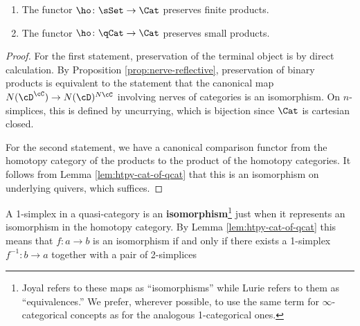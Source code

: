 \begin{lemma}\label{lem:ho-preserves-products}
  $\quad$
  \begin{enumerate}
  \item The functor $\ho \colon \sSet \to \Cat$ preserves finite products.
  \item The functor $\ho \colon \qCat \to \Cat$ preserves small products.
  \end{enumerate}
\end{lemma}
\begin{proof}
  For the first statement, preservation of the terminal object is by direct calculation. By Proposition \ref{prop:nerve-reflective}, preservation of binary products is equivalent to the statement that the canonical map $N(\cD^\cC) \to N(\cD)^{N\cC}$ involving nerves of categories is an isomorphism. On $n$-simplices, this is defined by uncurrying, which is bijection since $\Cat$ is cartesian closed.

  For the second statement, we have a canonical comparison functor from the homotopy category of the products to the product of the homotopy categories. It follows from Lemma \ref{lem:htpy-cat-of-qcat} that this is an isomorphism on underlying quivers, which suffices.
\end{proof}



   \begin{definition}\label{defn:isomorphism}
     A 1-simplex in a quasi-category is an \textbf{isomorphism}\footnote{Joyal refers to these maps as ``isomorphisms'' while Lurie refers to them as ``equivalences.'' We prefer, wherever possible, to use the same term for $\infty$-categorical concepts as for the analogous 1-categorical ones.} just when it represents an isomorphism in the homotopy category. By Lemma \ref{lem:htpy-cat-of-qcat} this means that $f \colon a \to b$ is an isomorphism if and only if there exists a 1-simplex $f^{-1} \colon b \to a$ together with a pair of 2-simplices
   \begin{center}
   \end{center}
   \end{definition}

